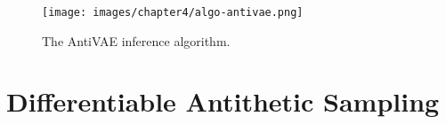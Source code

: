 \begin{figure}
    \centering
    \texttt{[image: images/chapter4/algo-antivae.png]}
    \caption{The AntiVAE inference algorithm.}
    \label{algo:vae_forward}
\end{figure}

\section{Differentiable Antithetic Sampling}




